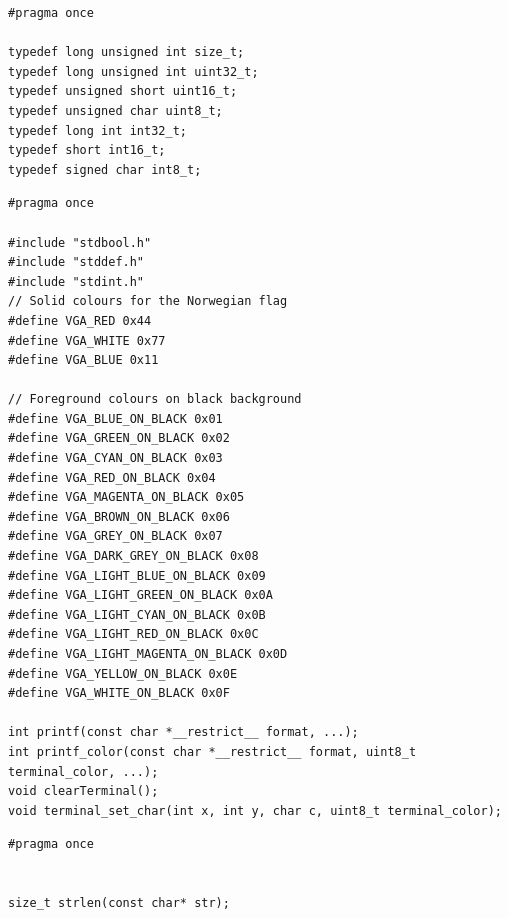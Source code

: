 \documentclass[../main.tex]{subfiles}
\begin{document}
\label{lst:stdint_h}
\begin{verbatim}
#pragma once

typedef long unsigned int size_t;
typedef long unsigned int uint32_t;
typedef unsigned short uint16_t;
typedef unsigned char uint8_t;
typedef long int int32_t;
typedef short int16_t;
typedef signed char int8_t;

\end{verbatim}


\label{lst:stdio_h}
\begin{verbatim}
#pragma once

#include "stdbool.h"
#include "stddef.h"
#include "stdint.h"
// Solid colours for the Norwegian flag
#define VGA_RED 0x44
#define VGA_WHITE 0x77
#define VGA_BLUE 0x11

// Foreground colours on black background
#define VGA_BLUE_ON_BLACK 0x01
#define VGA_GREEN_ON_BLACK 0x02
#define VGA_CYAN_ON_BLACK 0x03
#define VGA_RED_ON_BLACK 0x04
#define VGA_MAGENTA_ON_BLACK 0x05
#define VGA_BROWN_ON_BLACK 0x06
#define VGA_GREY_ON_BLACK 0x07
#define VGA_DARK_GREY_ON_BLACK 0x08
#define VGA_LIGHT_BLUE_ON_BLACK 0x09
#define VGA_LIGHT_GREEN_ON_BLACK 0x0A
#define VGA_LIGHT_CYAN_ON_BLACK 0x0B
#define VGA_LIGHT_RED_ON_BLACK 0x0C
#define VGA_LIGHT_MAGENTA_ON_BLACK 0x0D
#define VGA_YELLOW_ON_BLACK 0x0E
#define VGA_WHITE_ON_BLACK 0x0F

int printf(const char *__restrict__ format, ...);
int printf_color(const char *__restrict__ format, uint8_t terminal_color, ...);
void clearTerminal();
void terminal_set_char(int x, int y, char c, uint8_t terminal_color);

\end{verbatim}


\label{lst:string_h}
\begin{verbatim}
#pragma once


size_t strlen(const char* str);
\end{verbatim}
\end{document}
